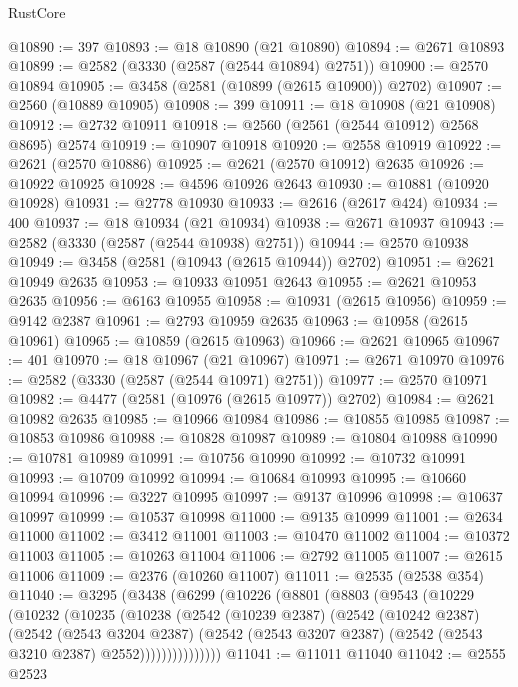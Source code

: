 \begin{lexlean}{RustCore}
\begin{coremodule}
@10890 := 397
@10893 := @18 @10890 (@21 @10890)
@10894 := @2671 @10893
@10899 := @2582 (@3330 (@2587 (@2544 @10894) @2751))
@10900 := @2570 @10894
@10905 := @3458 (@2581 (@10899 (@2615 @10900)) @2702)
@10907 := @2560 (@10889 @10905)
@10908 := 399
@10911 := @18 @10908 (@21 @10908)
@10912 := @2732 @10911
@10918 := @2560 (@2561 (@2544 @10912) @2568 @8695) @2574
@10919 := @10907 @10918
@10920 := @2558 @10919
@10922 := @2621 (@2570 @10886)
@10925 := @2621 (@2570 @10912) @2635
@10926 := @10922 @10925
@10928 := @4596 @10926 @2643
@10930 := @10881 (@10920 @10928)
@10931 := @2778 @10930
@10933 := @2616 (@2617 @424)
@10934 := 400
@10937 := @18 @10934 (@21 @10934)
@10938 := @2671 @10937
@10943 := @2582 (@3330 (@2587 (@2544 @10938) @2751))
@10944 := @2570 @10938
@10949 := @3458 (@2581 (@10943 (@2615 @10944)) @2702)
@10951 := @2621 @10949 @2635
@10953 := @10933 @10951 @2643
@10955 := @2621 @10953 @2635
@10956 := @6163 @10955
@10958 := @10931 (@2615 @10956)
@10959 := @9142 @2387
@10961 := @2793 @10959 @2635
@10963 := @10958 (@2615 @10961)
@10965 := @10859 (@2615 @10963)
@10966 := @2621 @10965
@10967 := 401
@10970 := @18 @10967 (@21 @10967)
@10971 := @2671 @10970
@10976 := @2582 (@3330 (@2587 (@2544 @10971) @2751))
@10977 := @2570 @10971
@10982 := @4477 (@2581 (@10976 (@2615 @10977)) @2702)
@10984 := @2621 @10982 @2635
@10985 := @10966 @10984
@10986 := @10855 @10985
@10987 := @10853 @10986
@10988 := @10828 @10987
@10989 := @10804 @10988
@10990 := @10781 @10989
@10991 := @10756 @10990
@10992 := @10732 @10991
@10993 := @10709 @10992
@10994 := @10684 @10993
@10995 := @10660 @10994
@10996 := @3227 @10995
@10997 := @9137 @10996
@10998 := @10637 @10997
@10999 := @10537 @10998
@11000 := @9135 @10999
@11001 := @2634 @11000
@11002 := @3412 @11001
@11003 := @10470 @11002
@11004 := @10372 @11003
@11005 := @10263 @11004
@11006 := @2792 @11005
@11007 := @2615 @11006
@11009 := @2376 (@10260 @11007)
@11011 := @2535 (@2538 @354)
@11040 := @3295
    (@3438
      (@6299
        (@10226
          (@8801
            (@8803
              (@9543
                (@10229
                  (@10232
                    (@10235
                      (@10238
                        (@2542
                          (@10239 @2387)
                          (@2542
                            (@10242 @2387)
                            (@2542
                              (@2543 @3204 @2387)
                              (@2542
                                (@2543 @3207 @2387)
                                (@2542 (@2543 @3210 @2387) @2552)))))))))))))))
@11041 := @11011 @11040
@11042 := @2555 @2523

\end{coremodule}
\end{lexlean}
